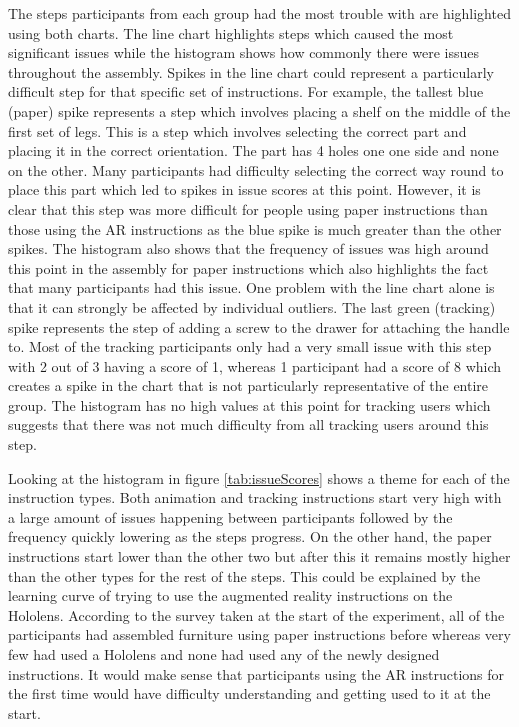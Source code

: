 \documentclass{l4proj}
\begin{document}
The steps participants from each group had the most trouble with are highlighted using both charts. The line chart highlights steps which caused the most significant issues while the histogram shows how commonly there were issues throughout the assembly. Spikes in the line chart could represent a particularly difficult step for that specific set of instructions. For example, the tallest blue (paper) spike represents a step which involves placing a shelf on the middle of the first set of legs. This is a step which involves selecting the correct part and placing it in the correct orientation. The part has 4 holes one one side and none on the other. Many participants had difficulty selecting the correct way round to place this part which led to spikes in issue scores at this point. However, it is clear that this step was more difficult for people using paper instructions than those using the AR instructions as the blue spike is much greater than the other spikes. The histogram also shows that the frequency of issues was high around this point in the assembly for paper instructions which also highlights the fact that many participants had this issue. One problem with the line chart alone is that it can strongly be affected by individual outliers. The last green (tracking) spike represents the step of adding a screw to the drawer for attaching the handle to. Most of the tracking participants only had a very small issue with this step with 2 out of 3 having a score of 1, whereas 1 participant had a score of 8 which creates a spike in the chart that is not particularly representative of the entire group. The histogram has no high values at this point for tracking users which suggests that there was not much difficulty from all tracking users around this step.

Looking at the histogram in figure \ref{tab:issueScores} shows a theme for each of the instruction types. Both animation and tracking instructions start very high with a large amount of issues happening between participants followed by the frequency quickly lowering as the steps progress. On the other hand, the paper instructions start lower than the other two but after this it remains mostly higher than the other types for the rest of the steps. This could be explained by the learning curve of trying to use the augmented reality instructions on the Hololens. According to the survey taken at the start of the experiment, all of the participants had assembled furniture using paper instructions before whereas very few had used a Hololens and none had used any of the newly designed instructions. It would make sense that participants using the AR instructions for the first time would have difficulty understanding and getting used to it at the start. 
\end{document}
